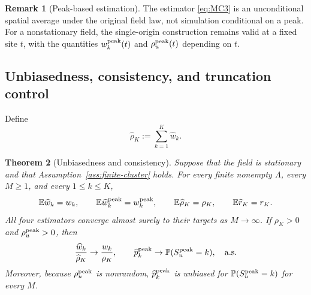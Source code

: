 \documentclass[aap,preprint]{imsart}
\theoremstyle{plain}
\newtheorem{theorem}{Theorem}[section]
\theoremstyle{definition}
\newtheorem{remark}[theorem]{Remark}
\def\E{{\mathbb E}}
\def\P{{\mathbb P}}
\begin{document}
\begin{remark}[Peak-based estimation]
	\label{remark:MC-peak}
	The estimator \eqref{eq:MC3} is an unconditional spatial average under
	the original field law, not simulation conditional on a peak.  For a
	nonstationary field, the single-origin construction remains valid at a
	fixed site $t$, with the quantities
	$w_k^{\rm peak}(t)$ and $\rho_u^{\rm peak}(t)$ depending on $t$.
\end{remark}

\subsection{Unbiasedness, consistency, and truncation control}
\label{sec:mc-unbiased}

Define 
\begin{equation*}
	\widehat\rho_K:=\sum_{k=1}^K\widehat w_k.
\end{equation*}

\begin{theorem}[Unbiasedness and consistency]
	\label{thm:mc-unbiased}
	Suppose that the field is stationary and that
	Assumption~\ref{ass:finite-cluster} holds.  For every finite nonempty
	$\Lambda$, every $M\geq1$, and every $1\leq k\leq K$,
	\begin{equation}\label{eq:mc-unbiasedness}
		\E\widehat w_k=w_k,
		\qquad
		\E\widehat w_k^{\rm peak}=w_k^{\rm peak},
		\qquad
		\E\widehat\rho_K=\rho_K,
		\qquad
		\E\widehat r_K=r_K.
	\end{equation}
	All four estimators converge almost surely to their targets as
	$M\to\infty$.  If $\rho_K>0$ and $\rho_u^{\rm peak}>0$, then
	\begin{equation}\label{eq:mc-ratio-consistency}
		\frac{\widehat w_k}{\widehat\rho_K}
		\to\frac{w_k}{\rho_K},
		\qquad
		\widehat p_k^{\rm peak}
		\to
		\P(S_u^{\rm peak}=k), \quad {\rm a.s}.
	\end{equation}
	Moreover, because $\rho_u^{\rm peak}$ is nonrandom,
	$\widehat p_k^{\rm peak}$ is unbiased for
	$\P(S_u^{\rm peak}=k)$ for every $M$.
\end{theorem}
\end{document}
